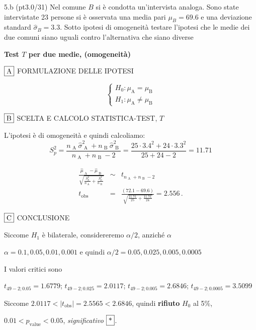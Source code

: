 \documentclass[
  10pt,
]{article}
\begin{document}
5.b (pt\hspace{.1em}3.0/31) Nel comune \(B\) si è condotta un'intervista analoga.
Sono state intervistate 23 persone si è osservata una media pari \(\mu_B=69.6\) e una deviazione standard \(\hat\sigma_B=3.3\).
Sotto ipotesi di omogeneità testare l'ipotesi che le medie dei due comuni siano uguali contro l'alternativa che siano diverse

\begin{sol}
\textbf{Test \(T\) per due medie, (omogeneità)}

\(\fbox{A}\) FORMULAZIONE DELLE IPOTESI

\[\begin{cases}
   H_0: \mu_\text{A} = \mu_\text{B} \\
   H_1: \mu_\text{A} \neq \mu_\text{B} 
   \end{cases}\]

\(\fbox{B}\) SCELTA E CALCOLO STATISTICA-TEST, \(T\)

L'ipotesi è di omogeneità e quindi calcoliamo:\[
   S_p^2=\frac{n_\text{ A }\hat\sigma^2_\text{ A }+n_\text{ B }\hat\sigma^2_\text{ B }}{n_\text{ A }+n_\text{ B }-2} =
   \frac{ 25 \cdot 3.4 ^2+ 24 \cdot 3.3 ^2}{ 25 + 24 -2}= 11.71 
  \]

\begin{eqnarray*}
  \frac{\hat\mu_\text{ A } - \hat\mu_\text{ B }}
  {\sqrt{\frac {S^2_p}{n_\text{ A }}+\frac {S^2_p}{n_\text{ B }}}}&\sim&t_{n_\text{ A }+n_\text{ B }-2}\\
  t_{\text{obs}}
  &=& \frac{ ( 72.1 -  69.6 )} {\sqrt{\frac{ 11.71 }{ 25 }+\frac{ 11.71 }{ 24 }}}
  =   2.556 \, .
  \end{eqnarray*}

\(\fbox{C}\) CONCLUSIONE

Siccome \(H_1\) è bilaterale, considereremo \(\alpha/2\),
anziché \(\alpha\)

\(\alpha=0.1, 0.05, 0.01, 0.001\) e quindi \(\alpha/2=0.05, 0.025, 0.005, 0.0005\)

I valori critici sono

\(t_{49-2;0.05}=1.6779\); \(t_{49-2;0.025}=2.0117\); \(t_{49-2;0.005}=2.6846\); \(t_{49-2;0.0005}=3.5099\)

Siccome \(2.0117<|t_\text{obs}|=2.5565<2.6846\), quindi \textbf{rifiuto} \(H_0\) al 5\%,

\(0.01<p_\text{value}<0.05\), \emph{significativo} \(\fbox{*}\).


\end{sol}
\end{document}
